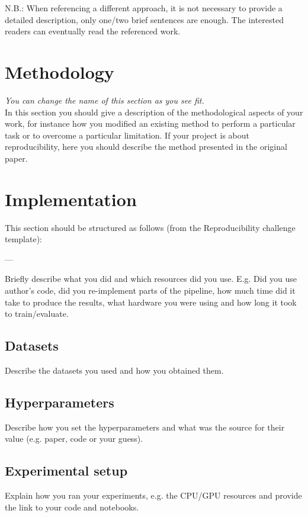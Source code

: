 \documentclass{gdl}
\begin{document}
N.B.: When referencing a different approach, it is not necessary to provide a detailed description, only one/two brief sentences are enough. The interested readers can eventually read the referenced work. 

\section{Methodology}

\textit{You can change the name of this section as you see fit.}\\
In this section you should give a description of the methodological aspects of your work, for instance how you modified an existing method to perform a particular task or to overcome a particular limitation. If your project is about reproducibility, here you should describe the method presented in the original paper.

\section{Implementation}

This section should be structured as follows (from the Reproducibility challenge template):

---

Briefly describe what you did and which resources did you use. E.g. Did you use author's code, did you re-implement parts of the pipeline, how much time did it take to produce the results, what hardware you were using and how long it took to train/evaluate. 

\subsection{Datasets}
Describe the datasets you used and how you obtained them. 

\subsection{Hyperparameters}
Describe how you set the hyperparameters and what was the source for their value (e.g. paper, code or your guess). 

\subsection{Experimental setup}
Explain how you ran your experiments, e.g. the CPU/GPU resources and provide the link to your code and notebooks.
\end{document}
